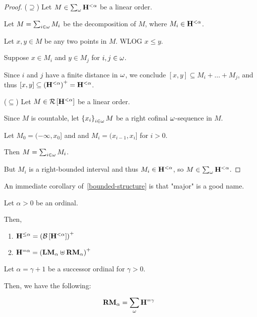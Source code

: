 \begin{proof}
  ($\supseteq$) Let $M \in \sum_{\omega}{\mathbf{H}^{< \alpha}}$ be a linear order.

  Let $M = \sum_{i \in \omega} M_i$ be the decomposition of $M$,
  where $M_i \in \mathbf{H}^{< \alpha}$.

  Let $x, y \in M$ be any two points in $M$. WLOG $x \le y$.

  Suppose $x \in M_i$ and $y \in M_j$ for $i, j \in \omega$.

  Since $i$ and $j$ have a finite distance in $\omega$,
  we conclude $[x, y] \subseteq M_i + \ldots + M_j$,
  and thus $[x, y] \subseteq \left( {\mathbf{H}^{< \alpha}} \right)^+ = \mathbf{H}^{< \alpha}$.

  ($\subseteq$) Let $M \in \mathcal{R} \left[ {\mathbf{H}^{< \alpha}} \right]$ be a linear order.

  Since $M$ is countable, let $\left\{ {x_i} \right\}_{i \in \omega} M$ be a right cofinal
  $\omega$-sequence in $M$.

  Let $M_0 = (-\infty, x_0]$ and and $M_i = (x_{i-1}, x_{i}]$ for $i > 0$.

  Then $M = \sum_{i \in \omega} M_i$.

  But $M_i$ is a right-bounded interval and thus $M_i \in \mathbf{H}^{< \alpha}$, so $M \in \sum_{\omega}{\mathbf{H}^{< \alpha}}$.
\end{proof}

An immediate corollary of~\cref{bounded-structure} is that "major" is a good name.
\begin{corollary}\label{le-alpha-corollary}
  Let $\alpha > 0$ be an ordinal.

  Then,
  \begin{enumerate}
    \item $\mathbf{H}^{\le \alpha} = \left( {\mathcal{B} \left[ {\mathbf{H}^{< \alpha}} \right]} \right)^+$
    \item $\mathbf{H}^{= \alpha} = \left( { \mathbf{LM}_{\alpha} \uplus \mathbf{RM}_{\alpha} } \right)^+$
  \end{enumerate}
\end{corollary}

\begin{lemma}\label{rmj-successor-decomposition}
  Let $\alpha = \gamma + 1$ be a successor ordinal for $\gamma > 0$.

  Then, we have the following:

  \[
    \mathbf{RM}_{\alpha} = \sum_{\omega}{\mathbf{H}^{= \gamma}}
  \]
\end{lemma}

